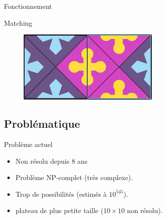 	\begin{frame}{Fonctionnement}
		\begin{Bblock}{Matching}
			\begin{figure}
				\includegraphics[width=0.5\linewidth]{images/matching_pieces}
			\end{figure}
		\end{Bblock}
	\end{frame}

	\subsection{Problématique}
	
	\begin{frame}{Problème actuel}
		\begin{itemize}[<+->]
			\item Non résolu depuis 8 ans
			\item Problème NP-complet (très complexe).
			\item Trop de possibilités (estimés à $10^{545}$).
			\item plateau de plus petite taille ($10\times 10$ non résolu).
		\end{itemize}
	\end{frame}